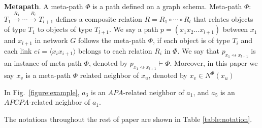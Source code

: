 \begin{definition}
\textbf{Metapath}\citep{SunHYYW11}. 
A meta-path $\Phi$ is a path defined on a graph schema. Meta-path $\Phi$: $T_1 \stackrel{R_1}{\longrightarrow} \cdots \stackrel{R_l}{\longrightarrow} T_{l+1}$ defines a composite relation $R = R_1 \circ \cdots \circ R_l$ that relates objects of type $T_1$ to objects of type $T_{l+1}$. 
We say a path $p = (x_1x_2\ldots x_{l+1})$ between $x_1$ and $x_{l+1}$ in network $G$ follows the meta-path $\Phi$, if each object is of type $T_i$ and each link $ei = \langle x_ix_{i+1}\rangle$ belongs to each relation $R_i$ in $\Phi$. 
We say that $p_{x_1 \rightsquigarrow x_{l+1}}$ is an instance of meta-path $\Phi$, denoted by $p_{x_1 \rightsquigarrow x_{l+1}} \vdash \Phi$.
Moreover, in this paper we say $x_v$ is a meta-path $\Phi$ related neighbor of $x_u$, denoted by $x_v \in N^\Phi(x_u)$

\end{definition}

\begin{example}
In Fig.~\ref{figure:example}, $a_3$ is an $APA$-related neighbor of $a_1$, and $a_5$ is an $APCPA$-related neighbor of $a_1$. 
\end{example}



The notations throughout the rest of paper are shown in Table \ref{table:notation}.



